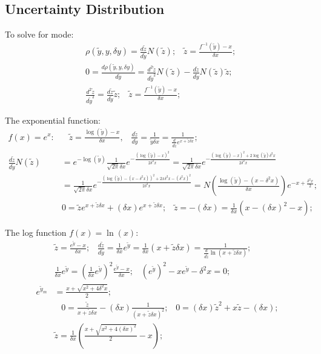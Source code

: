 \documentclass[twoside]{article}
\numberwithin{equation}{section}
\newcommand{\eqspace}{\;\;\;}
\begin{document}
\subsection{Uncertainty Distribution}

\iffalse

To solve for mode:
\begin{align*}
& \rho(\tilde{y}, y, \delta y) = \frac{d \tilde{z}}{d \tilde{y}} N(\tilde{z});
\eqspace \tilde{z} = \frac{f^{-1}(\tilde{y}) - x}{\delta x}; \\
& 0 = \frac{d \rho(\tilde{y}, y, \delta y)}{d \tilde{y}} = \frac{d^2 \tilde{z}}{d \tilde{y}^2} N(\tilde{z}) - \frac{d \tilde{z}}{d \tilde{y}} N(\tilde{z}) \tilde{z}; \\
& \frac{d^2 \tilde{z}}{d \tilde{y}^2} = \frac{d \tilde{z}}{d \tilde{y}} \tilde{z}; \eqspace \tilde{z} = \frac{f^{-1}(\tilde{y}) - x}{\delta x};
\end{align*}

The exponential function:
\begin{align*}
f(x) = e^x:& \eqspace 
\tilde{z} = \frac{\log(\tilde{y}) - x}{\delta x}, \eqspace 
\frac{d \tilde{z}}{d \tilde{y}} = \frac{1}{\tilde{y} \delta x} = \frac{1}{\frac{d}{d \tilde{z}} e^{x + \tilde{z} \delta x}}; \eqspace \\
\frac{d \tilde{z}}{d \tilde{y}} N(\tilde{z})
&= e^{-\log(\tilde{y})} \frac{1}{\sqrt{2\pi} \delta x} e^{-\frac{(\log(\tilde{y}) - x)^2}{2 \delta^2 x}}
 = \frac{1}{\sqrt{2\pi} \delta x} e^{-\frac{(\log(\tilde{y}) - x)^2 + 2 \log(\tilde{y}) \delta^2 x }{2 \delta^2 x}} \\
& = \frac{1}{\sqrt{2\pi} \delta x} e^{-\frac{(\log(\tilde{y}) - (x - \delta^2 x))^2 + 2 x \delta^2 x - (\delta^2 x)^2 }{2 \delta^2 x}}
 = N(\frac{\log(\tilde{y}) - (x - \delta^2 x)}{\delta x}) e^{-x + \frac{\delta^2 x}{2}}; \\
& 0 = \tilde{z} e^{x + \tilde{z} \delta x} + (\delta x) e^{x + \tilde{z} \delta x}; \eqspace
 \tilde{z} = -(\delta x) = \frac{1}{\delta x}(x - (\delta x)^2 - x);
\end{align*}

The log function $f(x) = \ln(x)$:
\begin{align*}
& \tilde{z} = \frac{e^{\tilde{y}} - x}{\delta x}; \eqspace 
\frac{d \tilde{z}}{d \tilde{y}} = \frac{1}{\delta x} e^{\tilde{y}} = \frac{1}{\delta x} (x + \tilde{z} \delta x)
 = \frac{1}{\frac{d}{d \tilde{z}} \ln(x + \tilde{z} \delta x)}; \\
& \frac{1}{\delta x} e^{\tilde{y}} = (\frac{1}{\delta x} e^{\tilde{y}})^2 \frac{e^{\tilde{y}} - x}{\delta x}; \eqspace 
(e^{\tilde{y}})^2 - x e^{\tilde{y}} - \delta^2 x = 0; \\
e^{\tilde{y}_m} &= \frac{x + \sqrt{x^2 + 4 \delta^2 x}}{2}; \\
& \eqspace 0 = \frac{\tilde{z}}{x + \tilde{z} \delta x} - (\delta x) \frac{1}{(x + \tilde{z} \delta x)^2}; \eqspace
0 = (\delta x) \tilde{z}^2 + x \tilde{z} - (\delta x); \\
& \tilde{z} = \frac{1}{\delta x}(\frac{x + \sqrt{x^2 + 4 (\delta x)^2}}{2} - x);
\end{align*}
\end{document}
